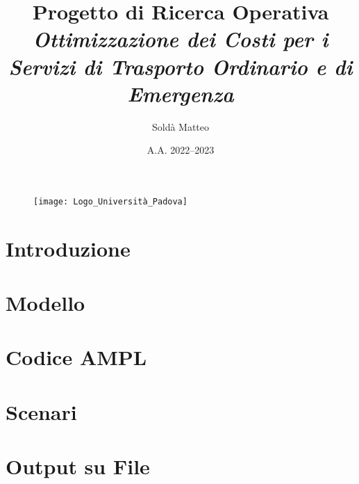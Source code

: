 \documentclass[10pt, a4paper]{article}
\title{%
\textbf{Progetto di Ricerca Operativa} \\ 
\textit{Ottimizzazione dei Costi per i Servizi di Trasporto Ordinario e di Emergenza}
}
\author{Soldà Matteo }
\date{A.A. 2022--2023}
\begin{document}
\begin{figure}
    \centering
    \texttt{[image: Logo\_Università\_Padova]}
\end{figure}

\maketitle

\newpage
\tableofcontents

\newpage
\section{Introduzione}


\newpage
\section{Modello}


\newpage
\section{Codice AMPL}

\newpage
\section{Scenari}


\newpage
\section{Output su File}

\end{document}
